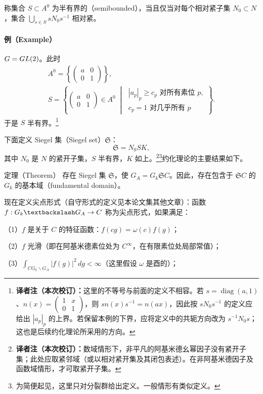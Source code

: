 称集合 $S\subset A^0$ 为半有界的（semibounded），当且仅当对每个相对紧子集 $N_0\subset N$，集合 $\bigcup_{s\in S}sN_0s^{-1}$ 相对紧。

\paragraph*{例（Example）}$G=GL(2)$。此时
\[
\begin{gathered}
A^0=\left\{\begin{pmatrix}a&0\\0&1\end{pmatrix}\right\},\\
S=\left\{\begin{pmatrix}a&0\\0&1\end{pmatrix}\in A^0\;\middle|\;
\substack{|a_p|_p\geq c_p\text{ 对所有素位 }p,\\c_p=1\text{ 对几乎所有 }p}\right\}.
\end{gathered}
\]
于是 $S$ 半有界。\footnote{\textbf{译者注（本次校订）：}这里的不等号与前面的定义不相容。若 $s=\operatorname{diag}(a,1)$、$n(x)=\left(\begin{smallmatrix}1&x\\0&1\end{smallmatrix}\right)$，则 $sn(x)s^{-1}=n(ax)$，因此按 $sN_0s^{-1}$ 的定义应给出 $|a_p|_p$ 的上界。若保留本例的下界，应将定义中的共轭方向改为 $s^{-1}N_0s$；这也是后续约化理论所采用的方向。}

下面定义 Siegel 集（Siegel set）$\mathfrak S$：
\[
\mathfrak S=N_0SK,
\]
其中 $N_0$ 是 $N$ 的紧开子集，$S$ 半有界，$K$ 如上。\footnote{\textbf{译者注（本次校订）：}数域情形下，非平凡的阿基米德幺幂因子没有紧开子集；此处应取紧邻域（或以相对紧开集及其闭包表述）。在非阿基米德因子及函数域情形，才可取紧开子集。}\footnote{为简便起见，这里只对分裂群给出定义。一般情形有类似定义。}约化理论的主要结果如下。
\begin{originaltheorem}{定理（Theorem）}
存在 Siegel 集 $\mathfrak S$，使 $G_A=G_k\mathfrak S C$。因此，存在包含于 $\mathfrak S C$ 的 $G_k$ 的基本域（fundamental domain）。
\end{originaltheorem}
现在定义尖点形式（自守形式的定义见本论文集其他文章）：函数 $f:G_k\backslash G_A\to\C$ 称为尖点形式，如果满足：

（1）$f$ 是关于 $C$ 的特征函数：$f(cg)=\omega(c)f(g)$；

（2）$f$ 光滑（即在阿基米德素位处为 $C^\infty$，在有限素位处局部常值）；

（3）$\int_{CG_k\backslash G_A}|f(g)|^2\,dg<\infty$（这里假设 $\omega$ 是酉的）；

